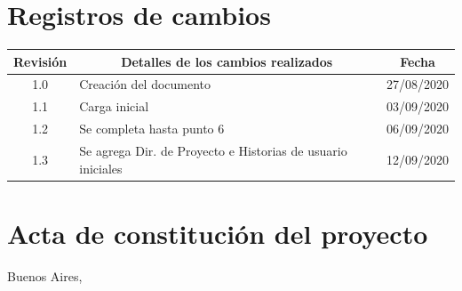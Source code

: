 \documentclass[11pt]{charter}
\begin{document}
\maketitle
\thispagestyle{empty}
\pagebreak


\thispagestyle{empty}
{\setlength{\parskip}{0pt}
\tableofcontents{}
}
\pagebreak


\section{Registros de cambios}
\label{sec:registro}


\begin{table}[ht]
\label{tab:registro}
\centering
\begin{tabularx}{\linewidth}{@{}|c|X|c|@{}}
\hline
\rowcolor[HTML]{C0C0C0} 
Revisión & \multicolumn{1}{c|}{\cellcolor[HTML]{C0C0C0}Detalles de los cambios realizados} & Fecha      \\ \hline
1.0      & Creación del documento                                          & 27/08/2020 \\ \hline
1.1      & Carga inicial                                                   & 03/09/2020 \\ \hline
1.2      & Se completa hasta punto 6									   & 06/09/2020 \\ \hline
1.3      & Se agrega Dir. de Proyecto e Historias de usuario iniciales	   & 12/09/2020 \\ \hline

\end{tabularx}
\end{table}

\pagebreak



\section{Acta de constitución del proyecto}
\label{sec:acta}

\begin{flushright}
Buenos Aires, \fechaInicioName
\end{flushright}

\vspace{2cm}
\end{document}
